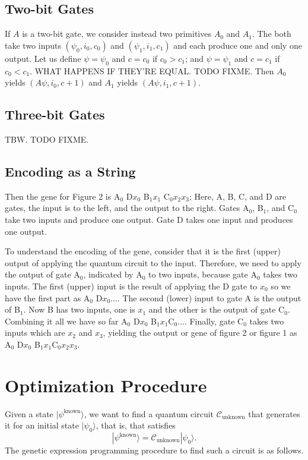 \documentclass{article}
\begin{document}
\subsection{Two-bit Gates}
If $A$ is a two-bit gate, we consider instead two primitives $A_0$ and $A_1$. 
The both take two inputs $(\psi_0, i_0, c_0)$ and $(\psi_1, i_1, c_1)$ and each produce one and only one output.
Let us define $\psi=\psi_0$ and $c=c_0$ if $c_0 > c_1$; and $\psi=\psi_1$ and $c=c_1$ if $c_0<c_1$. WHAT HAPPENS IF THEY'RE EQUAL. TODO FIXME.
Then $A_0$ yields $(A\psi, i_0, c + 1)$ and $A_1$ yields $(A\psi, i_1, c + 1)$.

\subsection{Three-bit Gates}
TBW. TODO FIXME.

\subsection{Encoding as a String}
Then the gene for Figure 2 is A$_0$ D$x_0$  B$_1x_1$ C$_0x_2x_3$;
Here, A, B, C, and D are gates, the input is to the left, and the output to the right.
Gates A$_0$, B$_1$, and C$_0$ take two inputs and produce one output. Gate D takes one input and produces one output.

To understand the encoding of the gene, consider that it is the first (upper) output of applying
the quantum circuit to the input. Therefore, we need
to apply the output of gate A$_0$, indicated by A$_0$ to two inputs, because
gate A$_0$ takes two inputs. The first (upper) input is the result of applying the D gate
to $x_0$ so we have the first part as A$_0$ D$x_0\ldots$. The second (lower) input to gate
A is the output of B$_1$. Now B has two inputs, one is $x_1$ and the other is
the output of gate C$_0$. Combining it all we have so far
A$_0$ D$x_0$ B$_1x_1$C$_0\ldots$. Finally, gate C$_0$ takes two inputs which are $x_2$ and $x_3$,
yielding the output or gene of figure 2 or figure 1 as A$_0$ D$x_0$ B$_1x_1$C$_0x_2x_3$.

\section{Optimization Procedure}
Given a state $|\psi^{\textrm{known}}\rangle$, we want to find a quantum
circuit $\mathcal{C}_{\textrm{unknown}}$ that generates it for an initial state $|\psi_0\rangle$,
that is, that satisfies 
\begin{equation}
	|\psi^{\textrm{known}}\rangle=\mathcal{C}_{\textrm{unknown}}|\psi_0\rangle.
\end{equation}
The genetic expression programming procedure to find such a circuit is as follows.
\end{document}
